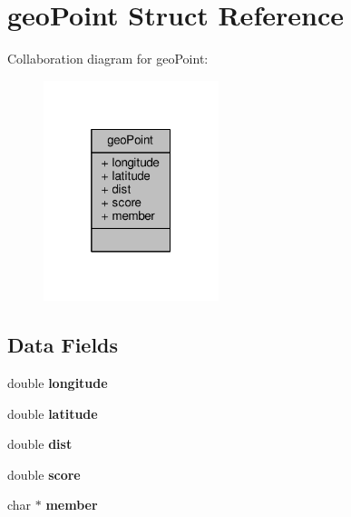 \hypertarget{structgeoPoint}{}\section{geo\+Point Struct Reference}
\label{structgeoPoint}


Collaboration diagram for geo\+Point\+:\nopagebreak
\begin{figure}[H]
\begin{center}
\leavevmode
\includegraphics[width=145pt]{structgeoPoint__coll__graph}
\end{center}
\end{figure}
\subsection*{Data Fields}
\begin{DoxyCompactItemize}
\item 
\mbox{\label{structgeoPoint_ac74494d18d8bcec6059914faa006489b}} 
double {\bfseries longitude}
\item 
\mbox{\label{structgeoPoint_a623f43a5345083ecbd20e10ef1c4abd9}} 
double {\bfseries latitude}
\item 
\mbox{\label{structgeoPoint_a7541ba7a36b28e2df80349061c8feee2}} 
double {\bfseries dist}
\item 
\mbox{\label{structgeoPoint_a573049108ad5c8467bd9f0b42dd05d71}} 
double {\bfseries score}
\item 
\mbox{\label{structgeoPoint_ad123c77a7663d8ab264e1b02620c8074}} 
char $\ast$ {\bfseries member}
\end{DoxyCompactItemize}


